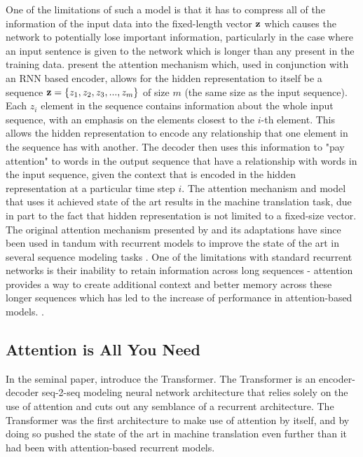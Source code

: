 One of the limitations of such a model is that it has to compress all of the information of the input data into the fixed-length vector $\mathbf{z}$ which causes the network to potentially lose important information, particularly in the case where an input sentence is given to the network which is longer than any present in the training data. \citet{bahdanau2014neural} present the attention mechanism which, used in conjunction with an RNN based encoder, allows for the hidden representation to itself be a sequence $\mathbf{z} = \{z_1, z_2, z_3, ..., z_m\}$ of size $m$ (the same size as the input sequence).    Each $z_i$ element in the sequence contains information about the whole input sequence, with an emphasis on the elements closest to the $i$-th element. This allows the hidden representation to encode any relationship that one element in the sequence has with another. The decoder then uses this information to "pay attention" to words in the output sequence that have a relationship with words in the input sequence, given the context that is encoded in the hidden representation at a particular time step $i$. The attention mechanism and model that uses it achieved state of the art results in the machine translation task, due in part to the fact that hidden representation is not limited to a fixed-size vector. The original attention mechanism presented by \citet{bahdanau2014neural} and its adaptations have since been used in tandum with recurrent models to improve the state of the art in several sequence modeling tasks . One of the limitations with standard recurrent networks is their inability to retain information across long sequences - attention provides a way to create additional context and better memory across these longer sequences which has led to the increase of performance in attention-based models. . 

\subsection{Attention is All You Need}

In the seminal paper, \citet{vaswani2017attention} introduce the Transformer. The Transformer is an encoder-decoder seq-2-seq modeling neural network architecture that relies solely on the use of attention and cuts out any semblance of a recurrent architecture. The Transformer was the first architecture to make use of attention by itself, and by doing so pushed the state of the art in machine translation even further than it had been with attention-based recurrent models. 

